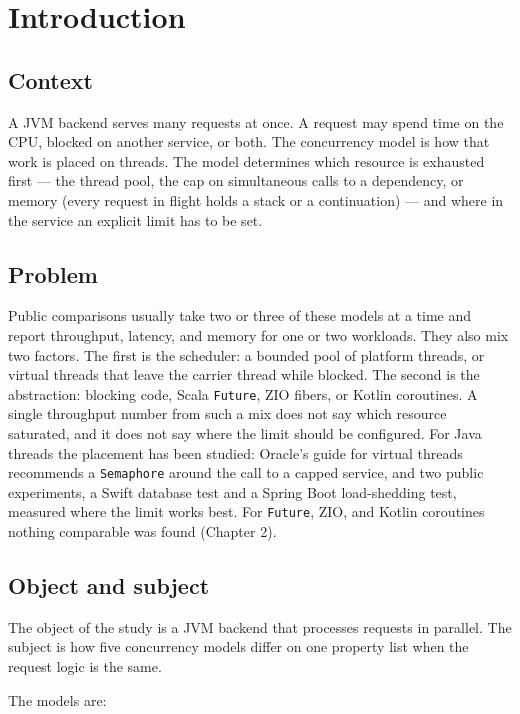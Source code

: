 \chapter{Introduction}
\label{chap:intro}

\section{Context}

A JVM backend serves many requests at once. A request may spend time on the CPU, blocked on another service, or both. The concurrency model is how that work is placed on threads. The model determines which resource is exhausted first --- the thread pool, the cap on simultaneous calls to a dependency, or memory (every request in flight holds a stack or a continuation) --- and where in the service an explicit limit has to be set.

\section{Problem}

Public comparisons usually take two or three of these models at a time and report throughput, latency, and memory for one or two workloads. They also mix two factors. The first is the scheduler: a bounded pool of platform threads, or virtual threads that leave the carrier thread while blocked. The second is the abstraction: blocking code, Scala \texttt{Future}, ZIO fibers, or Kotlin coroutines. A single throughput number from such a mix does not say which resource saturated, and it does not say where the limit should be configured. For Java threads the placement has been studied: Oracle’s guide for virtual threads recommends a \texttt{Semaphore} around the call to a capped service, and two public experiments, a Swift database test and a Spring Boot load-shedding test, measured where the limit works best. For \texttt{Future}, ZIO, and Kotlin coroutines nothing comparable was found (Chapter 2).

\section{Object and subject}

The object of the study is a JVM backend that processes requests in parallel. The subject is how five concurrency models differ on one property list when the request logic is the same.

The models are:

